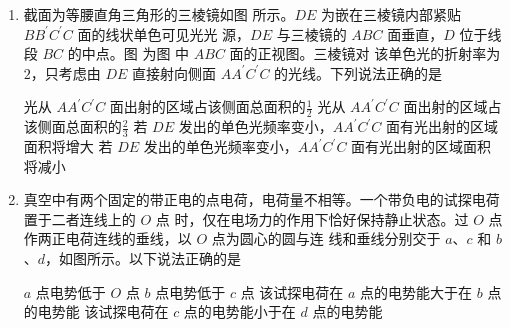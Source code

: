 \begin{enumerate}
\item
截面为等腰直角三角形的三棱镜如图  所示。$ DE $ 为嵌在三棱镜内部紧贴 $ BB ^{\prime} C ^{\prime} C $ 面的线状单色可见光光
源，$ DE $ 与三棱镜的 $ ABC $ 面垂直，$ D $ 位于线段 $ BC $ 的中点。图  为图  中 $ ABC $ 面的正视图。三棱镜对
该单色光的折射率为 $ 2 $，只考虑由 $ DE $ 直接射向侧面 $ AA ^{\prime} C ^{\prime} C $ 的光线。下列说法正确的是  
\begin{figure}[h!]
\centering
\begin{subfigure}{0.3\linewidth}
\centering
 
\caption{}\label{2020:山东:9a}
\end{subfigure}
\begin{subfigure}{0.3\linewidth}
\centering
 
\caption{}\label{2020:山东:9b}
\end{subfigure}
\end{figure}


\fourchoices
{光从 $ AA ^{\prime} C ^{\prime} C $ 面出射的区域占该侧面总面积的$ \frac{ 1 }{ 2 } $}
{光从 $ AA ^{\prime} C ^{\prime} C $ 面出射的区域占该侧面总面积的$ \frac{ 2 }{ 3 } $}
{若 $ DE $ 发出的单色光频率变小，$ AA ^{\prime} C ^{\prime} C $ 面有光出射的区域面积将增大}
{若 $ DE $ 发出的单色光频率变小，$ AA ^{\prime} C ^{\prime} C $ 面有光出射的区域面积将减小}





\item
真空中有两个固定的带正电的点电荷，电荷量不相等。一个带负电的试探电荷置于二者连线上的 $ O $ 点
时，仅在电场力的作用下恰好保持静止状态。过 $ O $ 点作两正电荷连线的垂线，以 $ O $ 点为圆心的圆与连
线和垂线分别交于 $ a $、$ c $ 和 $ b $、$ d $，如图所示。以下说法正确的是  
\begin{figure}[h!]
\centering

\end{figure}


\fourchoices
{$ a $ 点电势低于 $ O $ 点}
{$ b $ 点电势低于 $ c $ 点}
{该试探电荷在 $ a $ 点的电势能大于在 $ b $ 点的电势能}
{该试探电荷在 $ c $ 点的电势能小于在 $ d $ 点的电势能}







\end{enumerate}
